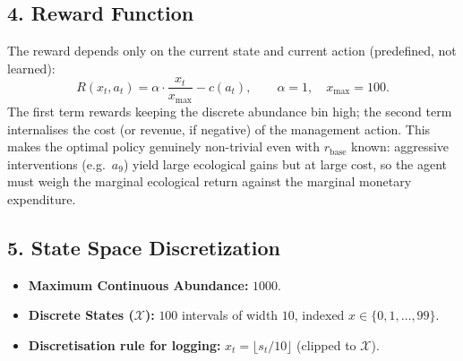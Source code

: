 \documentclass[11pt]{article}
\begin{document}
\subsection*{4. Reward Function}
The reward depends only on the current state and current action (predefined, not learned):
\[
    R(x_t, a_t) = \alpha \cdot \frac{x_t}{x_{\max}} - c(a_t), \qquad \alpha = 1, \quad x_{\max} = 100.
\]
The first term rewards keeping the discrete abundance bin high; the second term internalises the cost (or revenue, if negative) of the management action. This makes the optimal policy genuinely non-trivial even with $r_{\mathrm{base}}$ known: aggressive interventions (e.g.\ $a_9$) yield large ecological gains but at large cost, so the agent must weigh the marginal ecological return against the marginal monetary expenditure.

\subsection*{5. State Space Discretization}\begin{itemize}
    \item \textbf{Maximum Continuous Abundance:} $1000$.
    \item \textbf{Discrete States ($\mathcal{X}$):} $100$ intervals of width $10$, indexed $x \in \{0, 1, \dots, 99\}$.
    \item \textbf{Discretisation rule for logging:} $x_t = \lfloor s_t / 10 \rfloor$ (clipped to $\mathcal{X}$).
\end{itemize}

\end{document}
